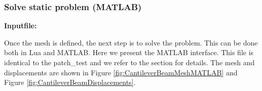 \clearpage
\subsubsection*{Solve static problem (MATLAB)}
\begin{flushleft}
  \textbf{Inputfile:}
  \\
\end{flushleft}
\hspace{1in}
{\footnotesize
{}
}
Once the mesh is defined, the next step is to solve the problem.
This can be done both in Lua and MATLAB. Here we present the MATLAB
interface. This file is identical
to the patch\_test and we refer to the section for details.
The mesh and displacements are shown in 
Figure \ref{fig:CantileverBeamMeshMATLAB}
and Figure \ref{fig:CantileverBeamDisplacements}.

